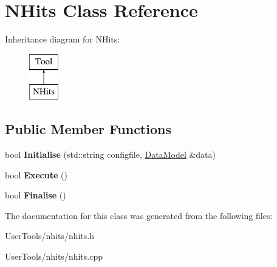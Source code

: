 \hypertarget{classNHits}{\section{N\-Hits Class Reference}
\label{classNHits}
}
Inheritance diagram for N\-Hits\-:\begin{figure}[H]
\begin{center}
\leavevmode
\includegraphics[height=2.000000cm]{classNHits}
\end{center}
\end{figure}
\subsection*{Public Member Functions}
\begin{DoxyCompactItemize}
\item 
\hypertarget{classNHits_abd81c3cb8af1593906acf093df2c183a}{bool {\bfseries Initialise} (std\-::string configfile, \hyperlink{classDataModel}{Data\-Model} \&data)}\label{classNHits_abd81c3cb8af1593906acf093df2c183a}

\item 
\hypertarget{classNHits_a173075c07d7b02639dbf9a3d3f284a3e}{bool {\bfseries Execute} ()}\label{classNHits_a173075c07d7b02639dbf9a3d3f284a3e}

\item 
\hypertarget{classNHits_aa7abae011ccead326f565f7781845a3f}{bool {\bfseries Finalise} ()}\label{classNHits_aa7abae011ccead326f565f7781845a3f}

\end{DoxyCompactItemize}


The documentation for this class was generated from the following files\-:\begin{DoxyCompactItemize}
\item 
User\-Tools/nhits/nhits.\-h\item 
User\-Tools/nhits/nhits.\-cpp\end{DoxyCompactItemize}
